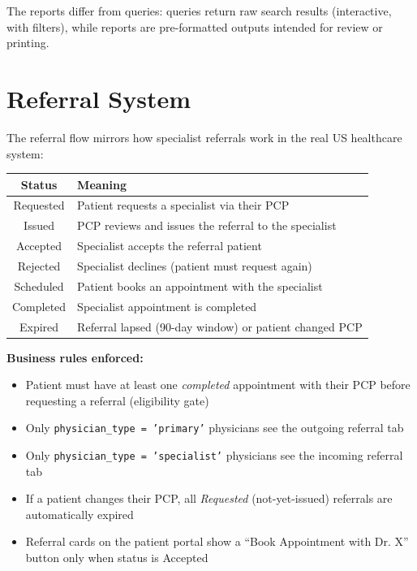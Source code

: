 \documentclass[12pt, letterpaper]{article}
\begin{document}
The reports differ from queries: queries return raw search results (interactive, with filters), while reports are pre-formatted outputs intended for review or printing.

\section{Referral System}

The referral flow mirrors how specialist referrals work in the real US healthcare system:

\begin{center}
\begin{tabular}{cl}
  \toprule
  \textbf{Status} & \textbf{Meaning} \\
  \midrule
  Requested  & Patient requests a specialist via their PCP \\
  Issued     & PCP reviews and issues the referral to the specialist \\
  Accepted   & Specialist accepts the referral patient \\
  Rejected   & Specialist declines (patient must request again) \\
  Scheduled  & Patient books an appointment with the specialist \\
  Completed  & Specialist appointment is completed \\
  Expired    & Referral lapsed (90-day window) or patient changed PCP \\
  \bottomrule
\end{tabular}
\end{center}

\textbf{Business rules enforced:}
\begin{itemize}
  \item Patient must have at least one \textit{completed} appointment with their PCP before requesting a referral (eligibility gate)
  \item Only \texttt{physician\_type = 'primary'} physicians see the outgoing referral tab
  \item Only \texttt{physician\_type = 'specialist'} physicians see the incoming referral tab
  \item If a patient changes their PCP, all \textit{Requested} (not-yet-issued) referrals are automatically expired
  \item Referral cards on the patient portal show a ``Book Appointment with Dr. X'' button only when status is Accepted
\end{itemize}
\end{document}
